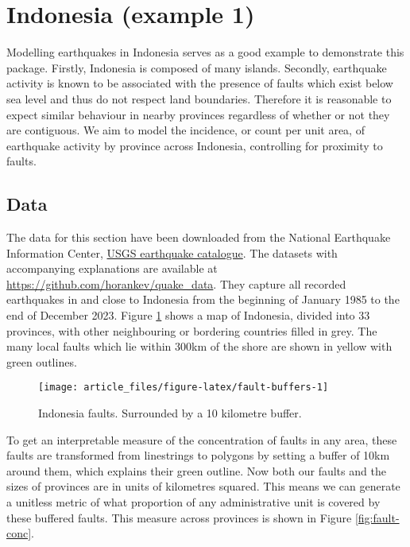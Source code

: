 \section{Indonesia (example 1)}\label{indonesia-example-1}

Modelling earthquakes in Indonesia serves as a good example to
demonstrate this package. Firstly, Indonesia is composed of many
islands. Secondly, earthquake activity is known to be associated with
the presence of faults which exist below sea level and thus do not
respect land boundaries. Therefore it is reasonable to expect similar
behaviour in nearby provinces regardless of whether or not they are
contiguous. We aim to model the incidence, or count per unit area, of earthquake activity by
province across Indonesia, controlling for proximity to faults.

\subsection{Data}\label{data}

The data for this section have been downloaded from the National Earthquake Information Center, \href{https://earthquake.usgs.gov/earthquakes/search/}{USGS earthquake
catalogue}. The
datasets with accompanying explanations are available at
\url{https://github.com/horankev/quake_data}. They capture all recorded earthquakes in
and close to Indonesia from the beginning of January 1985 to the end of December 2023. Figure \ref{fig:fault-buffers} shows a map of Indonesia, divided into 33 provinces, with other neighbouring or bordering countries filled in grey. The many local
faults which lie within 300km of the shore are shown in yellow with green outlines.

\begin{figure}

{\centering \texttt{[image: article\_files/figure-latex/fault-buffers-1]} 

}

\caption{Indonesia faults. Surrounded by a 10 kilometre buffer. }\label{fig:fault-buffers}
\end{figure}

To get an interpretable measure of the concentration of faults in any area,
these faults are transformed from linestrings to polygons by setting a buffer of
10km around them, which explains their green outline. Now both our faults and the sizes of provinces are in units of kilometres
squared. This means we can generate a unitless metric of what proportion of any administrative unit
is covered by these buffered faults. This measure across provinces is shown in Figure
\ref{fig:fault-conc}.

